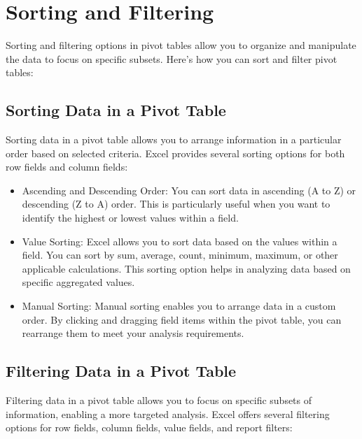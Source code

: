 \documentclass[
]{book}
\begin{document}
\hypertarget{sorting-and-filtering}{%
\section{Sorting and Filtering}\label{sorting-and-filtering}}

Sorting and filtering options in pivot tables allow you to organize and manipulate the data to focus on specific subsets. Here's how you can sort and filter pivot tables:

\hypertarget{sorting-data-in-a-pivot-table}{%
\subsection{Sorting Data in a Pivot Table}\label{sorting-data-in-a-pivot-table}}

Sorting data in a pivot table allows you to arrange information in a particular order based on selected criteria. Excel provides several sorting options for both row fields and column fields:

\begin{itemize}
\item
  Ascending and Descending Order: You can sort data in ascending (A to Z) or descending (Z to A) order. This is particularly useful when you want to identify the highest or lowest values within a field.
\item
  Value Sorting: Excel allows you to sort data based on the values within a field. You can sort by sum, average, count, minimum, maximum, or other applicable calculations. This sorting option helps in analyzing data based on specific aggregated values.
\item
  Manual Sorting: Manual sorting enables you to arrange data in a custom order. By clicking and dragging field items within the pivot table, you can rearrange them to meet your analysis requirements.
\end{itemize}

\hypertarget{filtering-data-in-a-pivot-table}{%
\subsection{Filtering Data in a Pivot Table}\label{filtering-data-in-a-pivot-table}}

Filtering data in a pivot table allows you to focus on specific subsets of information, enabling a more targeted analysis. Excel offers several filtering options for row fields, column fields, value fields, and report filters:
\end{document}
